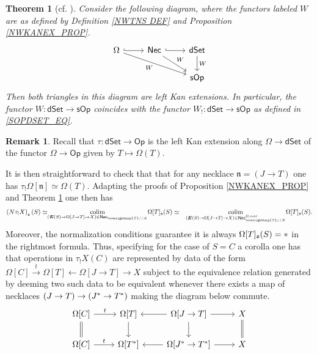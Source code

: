 \documentclass[a4paper,10pt
,draft
]{article}%
\numberwithin{equation}{section}
\numberwithin{figure}{section}
\newtheorem{theorem}[equation]{Theorem}%
\theoremstyle{definition} %
\newtheorem{remark}[equation]{Remark}%
\newcommand{\vect}[1]{\text{\overrightharp{\ensuremath{#1}}}}
\DeclareMathOperator{\colim}{colim}%
\newcommand{\1}{\ensuremath{\mathbbm 1}}%
\begin{document}
\begin{theorem}[{cf. \cite[Thm. 1.3]{DS11}}]
	\label{KANEXTCHAR THM}
	Consider the following diagram,
	where the functors labeled $W$ 
	are as defined by Definition \ref{NWTNS DEF}
	and Proposition \ref{NWKANEX_PROP}.
\begin{equation}
\begin{tikzcd}
	\Omega \ar[hookrightarrow]{r}
	\ar{rrd}[swap]{W} 
&
	\mathsf{Nec}
	\ar[hookrightarrow]{r}
	\ar{rd}{W}
&
	\mathsf{dSet}
	\ar{d}{W}
\\
&&
	\mathsf{sOp} 
\end{tikzcd}
\end{equation}
Then both triangles in this diagram are left Kan extensions.
%
In particular, the functor
$W \colon \mathsf{dSet} \to \mathsf{sOp}$
coincides with the functor
$W_! \colon \mathsf{dSet} \to \mathsf{sOp}$
as defined in \eqref{SOPDSET_EQ}.
\end{theorem}



\begin{remark}\label{TAUFUNEX REM}
	Recall that
	$\tau \colon \mathsf{dSet} \to \mathsf{Op}$
	is the left Kan extension along
	$\Omega \to \mathsf{dSet}$
	of the functor
	$\Omega \to \mathsf{Op}$
	given by $T \mapsto \Omega(T)$.
	
	It is then straightforward to check that
	that for any necklace
	$\mathfrak{n} = (J \to T)$
	one has 
	$\tau_! \Omega[\mathfrak{n}] \simeq \Omega(T)$.
	Adapting the proofs of 
	Proposition \ref{NWKANEX_PROP} and
	Theorem \ref{KANEXTCHAR THM} one then has
\begin{equation}
\begin{aligned}
	\left(N \tau_!X\right)_{\mathfrak{s}}(S) 
	\simeq &
\underset{(\boldsymbol{E}(S) \to 
	\Omega[J \to T] \to X)
	\in \mathsf{Nec}_{\vect{S}//X}}{\colim}
	\Omega[T]_{\mathfrak{s}}(S)
	\simeq &
\underset{(\boldsymbol{E}(S) \to 
	\Omega[J \to T] \to X)
	\in \mathsf{Nec}^{\Omega,nor}_{\vect{S}//X}}{\colim}
	\Omega[T]_{\mathfrak{s}}(S).
\end{aligned}
\end{equation}
Moreover, the normalization conditions guarantee
it is always 
$\Omega[T]_{\mathfrak{s}}(S) = \**$
in the rightmost formula.
Thus, specifying for the case of
$S=C$ a corolla one has that operations in
$\tau_!X(C)$
are represented by 
data of the form
$
	\Omega[C]
	\xrightarrow{t}
	\Omega[T]
	\leftarrow
	\Omega[J \to T]
	\to X
$
subject to the equivalence relation
generated by deeming two such data to be equivalent whenever there exists a map of necklaces
$(J \to T) \to (J^{\**} \to T^{\**})$
making the diagram below commute.
\[
\begin{tikzcd}
	\Omega[C] \ar{r}{t} \ar[equal]{d} &
	\Omega[T] \ar{d} &
	\Omega[J \to T] \ar{l} \ar{r} \ar{d} &
	X \ar[equal]{d}
\\
	\Omega[C] \ar{r}{t} &
	\Omega[T^{\**}] &
	\Omega[J^{\**} \to T^{\**}] \ar{l} \ar{r} &
	X
\end{tikzcd}
\]
\end{remark}
\end{document}
